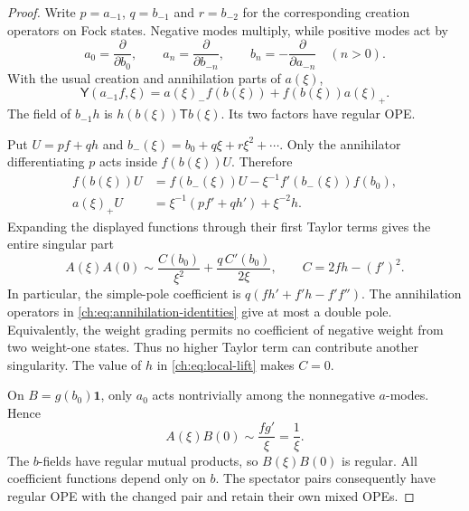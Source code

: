 \begin{proof}
Write $p=a_{-1}$, $q=b_{-1}$ and $r=b_{-2}$ for the
corresponding creation operators on Fock states.
Negative modes multiply, while positive modes act by
\begin{equation}\label{ch:eq:Fock-action}
       a_0=\frac{\partial}{\partial b_0},\qquad
       a_n=\frac{\partial}{\partial b_{-n}},\qquad
       b_n=-\frac{\partial}{\partial a_{-n}}\quad(n>0).
\end{equation}
With the usual creation and annihilation parts of $a(\xi)$,
\[
 \mathsf Y(a_{-1}f,\xi)
       =a(\xi)_-f(b(\xi))+f(b(\xi))a(\xi)_+.
\]
The field of $b_{-1}h$ is $h(b(\xi))\mathsf T b(\xi)$.
Its two factors have regular OPE.

Put $U=pf+qh$ and $b_-(\xi)=b_0+q\xi+r\xi^2+\cdots$.
Only the annihilator differentiating $p$ acts inside
$f(b(\xi))U$. Therefore
\begin{equation}\label{ch:eq:annihilation-identities}
 \begin{aligned}
 f(b(\xi))U&=f(b_-(\xi))U
                          -\xi^{-1}f'(b_-(\xi))f(b_0),\\
 a(\xi)_+U&=\xi^{-1}(pf'+qh')+\xi^{-2}h.
 \end{aligned}
\end{equation}
Expanding the displayed functions through their first Taylor
terms gives the entire singular part
\begin{equation}\label{ch:eq:self-OPE}
       A(\xi)A(0)\sim
       \frac{C(b_0)}{\xi^2}+
       \frac{q\,C'(b_0)}{2\xi},
       \qquad C=2fh-(f')^2.
\end{equation}
In particular, the simple-pole coefficient is
$q(fh'+f'h-f'f'')$.
The annihilation operators in
\eqref{ch:eq:annihilation-identities} give at most a double pole.
Equivalently, the weight grading permits no coefficient of
negative weight from two weight-one states.
Thus no higher Taylor term can contribute another singularity.
The value of $h$ in \eqref{ch:eq:local-lift} makes $C=0$.

On $B=g(b_0)\mathbf1$, only $a_0$ acts nontrivially among the
nonnegative $a$-modes. Hence
\[
                         A(\xi)B(0)\sim\frac{fg'}\xi=\frac1\xi.
\]
The $b$-fields have regular mutual products, so $B(\xi)B(0)$
is regular. All coefficient functions depend only on $b$.
The spectator pairs consequently have regular OPE with the
changed pair and retain their own mixed OPEs.
\end{proof}

